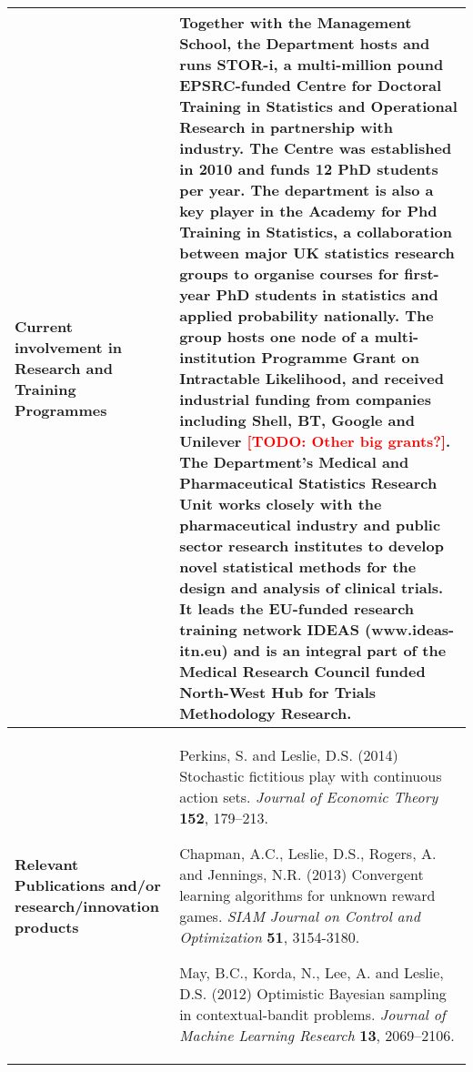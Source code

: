 \documentclass[a4paper,11pt]{article}
\newcommand{\TODO}[1]{{\textcolor{red}{[\textbf{TODO:} #1]}}}
\begin{document}
{\begin{tabular}{>{\raggedright}p{}p{}}
\\\midrule
\textbf{Current involvement in Research and Training Programmes} &
Together with the Management School, the Department hosts and runs STOR-i, a
multi-million pound EPSRC-funded Centre for Doctoral Training in
Statistics and Operational Research in partnership with industry.  The
Centre was established in 2010 and funds 12 PhD students per year.  The department is also a key player in the Academy for Phd Training in Statistics, a collaboration between major UK statistics research groups to organise courses for first-year PhD students in statistics and applied probability nationally.  The group hosts one node of a multi-institution Programme Grant on Intractable Likelihood, and received industrial funding from companies including Shell, BT, Google and Unilever \TODO{Other big grants?}. The
Department's Medical and Pharmaceutical Statistics Research Unit
works closely with the pharmaceutical
industry and public sector research institutes to develop novel
statistical methods for the design and analysis of clinical trials. It
leads the EU-funded research training network IDEAS (www.ideas-itn.eu) and
is an integral part of the Medical Research Council funded North-West Hub for Trials
Methodology Research.
\\\midrule
\textbf{Relevant Publications and/or research/innovation products} &

 Perkins, S. and Leslie, D.S. (2014)  Stochastic fictitious play with continuous action sets. {\em Journal of Economic Theory} {\bf 152}, 179--213.

Chapman, A.C., Leslie, D.S., Rogers, A. and Jennings, N.R. (2013) Convergent learning algorithms for unknown reward games. {\em SIAM Journal on Control and Optimization} {\bf 51}, 3154-3180.


May, B.C., Korda, N., Lee, A. and Leslie, D.S. (2012) Optimistic Bayesian sampling in contextual-bandit problems. {\em Journal of Machine Learning Research} {\bf 13}, 2069--2106.



\end{tabular}}
\end{document}
